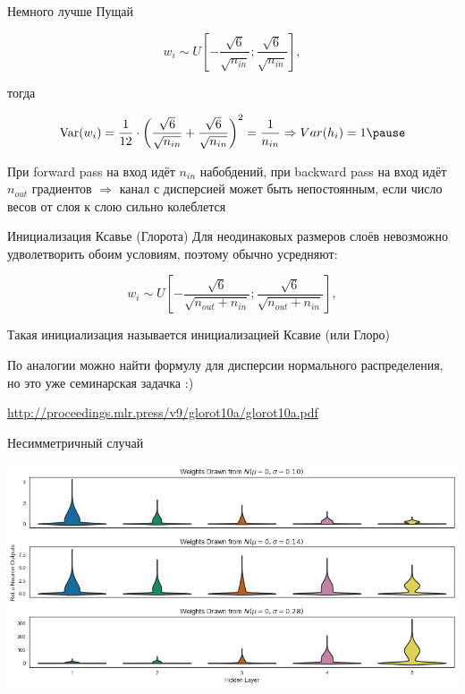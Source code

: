 \documentclass[notes,12pt, aspectratio=169]{beamer}
\DeclareMathOperator{\Var}{Var}
\begin{document}
\begin{frame}{Немного лучше}
	Пущай 
	
	$$ w_i \sim U \left[ - \frac{\sqrt{6}}{\sqrt{n_{in}}};  \frac{\sqrt{6}}{\sqrt{n_{in}}}  \right],$$
	
	тогда 
	
	$$
	\Var(w_i) = \frac{1}{12} \cdot \left( \frac{\sqrt{6}}{\sqrt{n_{in}}} + \frac{\sqrt{6}}{\sqrt{n_{in}}} \right)^2 = \frac{1}{n_{in}} \Rightarrow Var(h_i) = 1 \pause 
	$$
	
	\vfill 
	При forward pass на вход идёт $n_{in}$ набобдений, при backward pass на вход идёт $n_{out}$ градиентов $\Rightarrow$   \alert{канал с дисперсией может быть непостоянным, если число весов от слоя к слою сильно колеблется}
\end{frame}


\begin{frame}{Инициализация Ксавье (Глорота)}
Для неодинаковых размеров слоёв невозможно удволетворить обоим условиям, поэтому обычно усредняют: 

	$$ w_i \sim U \left[ - \frac{\sqrt{6}}{\sqrt{n_{out} + n_{in}}};  \frac{\sqrt{6}}{\sqrt{n_{out} + n_{in}}}  \right],$$

\vfill 

Такая инициализация называется \alert{инициализацией Ксавие (или Глоро)}

\vfill 

По аналогии можно найти формулу для дисперсии нормального распределения, но это уже семинарская задачка :)

\vfill %
\footnotesize
{\color{blue} \url{http://proceedings.mlr.press/v9/glorot10a/glorot10a.pdf}}
\end{frame}


\begin{frame}{Несимметричный случай}
\begin{center}
	\includegraphics[width=.9\linewidth]{init_relu.png}
\end{center}
\end{frame}
\end{document}
